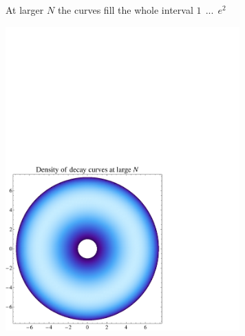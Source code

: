 \documentclass[12pt,letterpaper,landscape,KOMA,smallheadings,calcdimensions,display]{powersem}
\begin{document}
\begin{slide}

\centerline{At larger $ N $ the curves fill the whole interval $ 1~~ ... ~~e^2 $}

\vspace{-4.5cm}
\begin{center}
\hspace{2.5cm}
\includegraphics[width=9.0cm]{cmsdense.pdf}
\end{center}

\end{slide}
\end{document}
